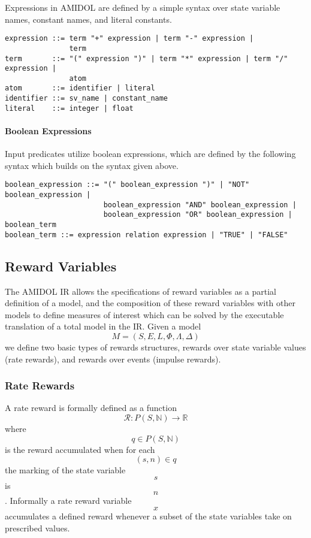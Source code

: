 \documentclass[]{article}
\let\oldparagraph\paragraph
\renewcommand{\paragraph}[1]{\oldparagraph{#1}\mbox{}}
\begin{document}
Expressions in AMIDOL are defined by a simple syntax over state variable
names, constant names, and literal constants.

\begin{verbatim}
expression ::= term "+" expression | term "-" expression |
               term
term       ::= "(" expression ")" | term "*" expression | term "/" expression |
               atom
atom       ::= identifier | literal
identifier ::= sv_name | constant_name
literal    ::= integer | float
\end{verbatim}

\paragraph{Boolean Expressions}\label{boolean-expressions}

Input predicates utilize boolean expressions, which are defined by the
following syntax which builds on the syntax given above.

\begin{verbatim}
boolean_expression ::= "(" boolean_expression ")" | "NOT" boolean_expression |
                       boolean_expression "AND" boolean_expression |
                       boolean_expression "OR" boolean_expression | boolean_term
boolean_term ::= expression relation expression | "TRUE" | "FALSE"
\end{verbatim}

\subsection{Reward Variables}\label{reward-variables}

The AMIDOL IR allows the specifications of reward variables as a partial
definition of a model, and the composition of these reward variables
with other models to define measures of interest which can be solved by
the executable translation of a total model in the IR. Given a model
\[M = (S, E, L, \Phi, \Lambda, \Delta)\] we define two basic types of
rewards structures, rewards over state variable values (rate rewards),
and rewards over events (impulse rewards).

\subsubsection{Rate Rewards}\label{rate-rewards}

A rate reward is formally defined as a function
\[\mathcal{R}: P(S, \mathbb{N}) \rightarrow \mathbb{R}\] where
\[q \in P(S, \mathbb{N})\] is the reward accumulated when for each
\[(s,n) \in q\] the marking of the state variable \[s\] is \[n\].
Informally a rate reward variable \[x\] accumulates a defined reward
whenever a subset of the state variables take on prescribed values.
\end{document}
